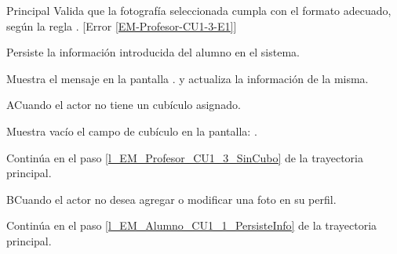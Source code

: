 \begin{UCtrayectoria}{Principal}
    \UCpaso Valida que la fotografía seleccionada cumpla con el formato adecuado, según la regla . [Error \ref{EM-Profesor-CU1-3-E1}]  

    \UCpaso Persiste la información introducida del alumno en el sistema. \label{l_EM_Profesor_CU1_3_PersisteInfo}

    \UCpaso Muestra el mensaje  en la pantalla
    . y actualiza la
    información de la misma. 
     
\end{UCtrayectoria}

\begin{UCtrayectoriaA}{A}{Cuando el actor no tiene un cubículo asignado.}

	\UCpaso Muestra vacío el campo de cubículo en la pantalla: .

	\UCpaso Continúa en el paso \ref{l_EM_Profesor_CU1_3_SinCubo} de la trayectoria principal.

\end{UCtrayectoriaA}

\begin{UCtrayectoriaA}{B}{Cuando el actor no desea agregar o modificar
una foto en su perfil.}

	\UCpaso Continúa en el paso \ref{l_EM_Alumno_CU1_1_PersisteInfo} de la trayectoria principal.

\end{UCtrayectoriaA}
